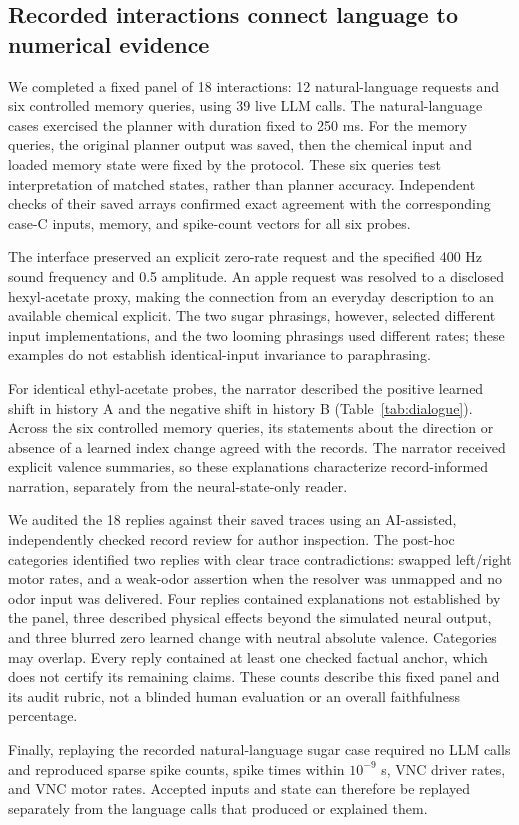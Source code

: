 \subsection{Recorded interactions connect language to numerical evidence}
We completed a fixed panel of 18 interactions: 12 natural-language requests and six controlled memory queries, using 39 live LLM calls. The natural-language cases exercised the planner with duration fixed to 250 ms. For the memory queries, the original planner output was saved, then the chemical input and loaded memory state were fixed by the protocol. These six queries test interpretation of matched states, rather than planner accuracy. Independent checks of their saved arrays confirmed exact agreement with the corresponding case-C inputs, memory, and spike-count vectors for all six probes.

The interface preserved an explicit zero-rate request and the specified 400 Hz sound frequency and 0.5 amplitude. An apple request was resolved to a disclosed hexyl-acetate proxy, making the connection from an everyday description to an available chemical explicit. The two sugar phrasings, however, selected different input implementations, and the two looming phrasings used different rates; these examples do not establish identical-input invariance to paraphrasing.

For identical ethyl-acetate probes, the narrator described the positive learned shift in history A and the negative shift in history B (Table~\ref{tab:dialogue}). Across the six controlled memory queries, its statements about the direction or absence of a learned index change agreed with the records. The narrator received explicit valence summaries, so these explanations characterize record-informed narration, separately from the neural-state-only reader.


We audited the 18 replies against their saved traces using an AI-assisted, independently checked record review for author inspection. The post-hoc categories identified two replies with clear trace contradictions: swapped left/right motor rates, and a weak-odor assertion when the resolver was unmapped and no odor input was delivered. Four replies contained explanations not established by the panel, three described physical effects beyond the simulated neural output, and three blurred zero learned change with neutral absolute valence. Categories may overlap. Every reply contained at least one checked factual anchor, which does not certify its remaining claims. These counts describe this fixed panel and its audit rubric, not a blinded human evaluation or an overall faithfulness percentage.

Finally, replaying the recorded natural-language sugar case required no LLM calls and reproduced sparse spike counts, spike times within $10^{-9}$ s, VNC driver rates, and VNC motor rates. Accepted inputs and state can therefore be replayed separately from the language calls that produced or explained them.
